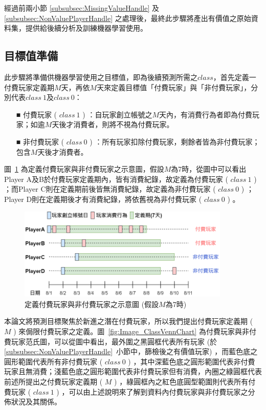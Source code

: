 經過前兩小節 \ref{subsubsec:MissingValueHandle} 及 \ref{subsubsec:NonValuePlayerHandle} 之處理後，最終此步驟將產出有價值之原始資料集，提供給後續分析及訓練機器學習使用。

\subsection{目標值準備}
\label{subsec:ClassPreparation}

此步驟將準備供機器學習使用之目標值，即為後續預測所需之$class$，首先定義一付費玩家定義期$M$天，再依$M$天來定義目標值「付費玩家」與「非付費玩家」，分別代表$class\ 1$及$class\ 0$：

\begin{itemize}
  \item [■] 付費玩家 ( $class\ 1$ ) ：自玩家創立帳號之$M$天內，有消費行為者即為付費玩家；如逾$M$天後才消費者，則將不視為付費玩家。
  \item [■] 非付費玩家 ( $class\ 0$ ) ：所有玩家扣除付費玩家，剩餘者皆為非付費玩家；包含$M$天後才消費者。
\end{itemize}
\newpage

圖~\ref{fig:Image_ClassPreparation} 為定義付費玩家與非付費玩家之示意圖，假設$M$為7時，從圖中可以看出Player A及B於付費玩家定義期內，皆有消費紀錄，故定義為付費玩家 ( $class\ 1$ ) ；而Player C則在定義期前後皆無消費紀錄，故定義為非付費玩家 ( $class\ 0$ ) ；Player D則在定義期後才有消費紀錄，將依舊視為非付費玩家 ( $class\ 0$ ) 。

\begin{figure}[!htb]
  \begin{center}
    \includegraphics[width=0.9\textwidth]{figures/Image_ClassPreparation.png}
    \caption[定義付費玩家與非付費玩家之示意圖]{定義付費玩家與非付費玩家之示意圖 (假設$M$為7時) }
    \label{fig:Image_ClassPreparation}
  \end{center}
\end{figure}

本論文將預測目標聚焦於新進之潛在付費玩家，所以我們提出付費玩家定義期 ( $M$ ) 來侷限付費玩家之定義。圖~\ref{fig:Image_ClassVennChart} 為付費玩家與非付費玩家范氏圖，可以從圖中看出，最外圍之黑圓框代表所有玩家 (於 \ref{subsubsec:NonValuePlayerHandle}~小節中，篩檢後之有價值玩家) ，而藍色底之圓形範圍代表所有非付費玩家 ( $class\ 0$ ) ，其中深藍色底之圓形範圍代表非付費玩家且無消費；淺藍色底之圓形範圍代表非付費玩家但有消費，內圈之綠圓框代表前述所提出之付費玩家定義期 ( $M$ ) ，綠圓框內之紅色底圓型範圍則代表所有付費玩家 ( $class\ 1$ ) ，可以由上述說明來了解到資料內付費玩家與非付費玩家之分佈狀況及其關係。

